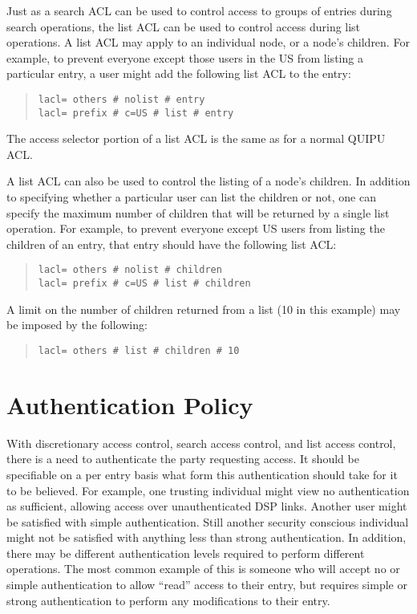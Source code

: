 Just as a search ACL can be used to control access to groups of entries
during search operations, the list ACL can be used to control access
during list operations.  A list ACL may apply to an individual node, or
a node's children.  For example, to prevent everyone except those users
in the US from listing a particular entry, a user might add the
following list ACL to the entry:

\begin{quote}\small\begin{verbatim}
lacl= others # nolist # entry
lacl= prefix # c=US # list # entry
\end{verbatim}\end{quote}

The access selector portion of a list ACL is the same as for a normal
QUIPU ACL.

A list ACL can also be used to control the listing of a node's children.
In addition to specifying whether a particular user can list the
children or not, one can specify the maximum number of children that
will be returned by a single list operation.  For example, to prevent
everyone except US users from listing the children of an entry,
that entry should have the following list ACL:

\begin{quote}\small\begin{verbatim}
lacl= others # nolist # children
lacl= prefix # c=US # list # children
\end{verbatim}\end{quote}

A limit on the number of children returned from a list (10 in this
example) may be imposed by the following:

\begin{quote}\small\begin{verbatim}
lacl= others # list # children # 10
\end{verbatim}\end{quote}

\section{Authentication Policy}
\label{disc_authp}

With discretionary access control, search access control, and list access
control, there is a need to authenticate the party requesting access.  It
should be specifiable on a per entry basis what form this authentication
should take for it to be believed.  For example, one trusting individual
might view no authentication as sufficient, allowing access over
unauthenticated DSP links.  Another user might be satisfied with simple
authentication.  Still another security conscious individual might not
be satisfied with anything less than strong authentication.
In addition, there may be different authentication levels required to
perform different operations.  The most common example of this is someone
who will accept no or simple authentication to allow ``read'' access to
their entry, but requires simple or strong authentication to perform
any modifications to their entry.

